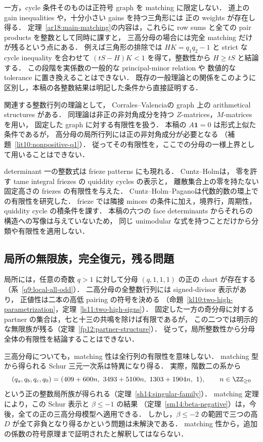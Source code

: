 一方，cycle 条件そのものは正符号 graph を matching に限定しない．
道上の gain inequalities や，十分小さい gains を持つ三角形には
正の weights が存在し得る．
定理~\ref{ar18:main-matching}の内容は，これらに
row sums と全ての pair products を整数として同時に課すと，
三高分母の場合には完全 matching だけが残るという点にある．
例えば三角形の排除では $HK=q_1q_2-1$ と strict な cycle inequality を合わせて
$(tS-H)K<1$ を得て，整数性から $H\ge tS$ と結論する．
この段階を実係数の一般的な principal-minor relation や
数値的な tolerance に置き換えることはできない．
既存の一般理論との関係をこのように区別し，本稿の各整数結果は明記した条件から直接証明する．

関連する整数行列の理論として，
Corrales--Valencia\cite[\S\S2--3]{CorralesValencia}の graph 上の arithmetical structures がある．
同理論は非正の非対角成分を持つ $Z$-matrices，$M$-matrices を用い，
固定した graph に対する有限性を扱う．
本稿の $A\mathbf1=0$ は形式上似た条件であるが，
高分母の局所行列には正の非対角成分が必要となる
（補題~\ref{lit10:nonpositive-q1}）．
従ってその有限性を，ここでの分母の一様上界として用いることはできない．

determinant 一の整数式は frieze patterns にも現れる．
Cuntz--Holm\cite[\S\S2--3 and~7]{CuntzHolmFriezes}は，
零を許す tame integral friezes の quiddity cycles の表示と，
離散集合上の零を持たない固定高さの friezes の有限性を与えた．
Cuntz--Holm--Pagano\cite{CuntzHolmPagano}は代数的数の環上での有限性を研究した．
frieze では隣接 minors の条件に加え，境界行，周期性，quiddity cycle の積条件を課す．
本稿の六つの face determinants からそれらの構造への写像は与えていないため，
同じ unimodular な式を持つことだけから分類や有限性を適用しない．

\subsection{局所の無限族，完全復元，残る問題}

局所には，任意の奇数 $q>1$ に対して分母 $(q,1,1,1)$ の正の chart が存在する
（系~\ref{q9:local-all-odd}）．
二高分母の全整数行列には signed-divisor 表示があり，
正値性は二本の高低 pairing の符号を決める
（命題~\ref{kl10:two-high-parametrization}，定理~\ref{ls11:two-high-signs}）．
固定した一方の奇分母に対する partner の集合は，七と十三の共鳴を除けば有限であるが，
この二つでは明示的な無限族が残る（定理~\ref{fp12:partner-structure}）．
従って，局所整数性から分母全体の有限性を結論することはできない．

三高分母についても，matching 性は全行列の有限性を意味しない．
matching 型から得られる Schur 三元一次系は特異になり得る．
実際，階数二の系から
\[
 (q_a,q_b,q_c,q_0)
 =(409+600n,\ 3493+5100n,\ 1303+1904n,\ 1),
 \qquad n\in\ZZ_{\ge0}
\]
という正の整数局所族が得られる（定理~\ref{sh14:singular-family}）．
matching 定理により，この Schur 表示と $\beta\le-1$ の結果
（定理~\ref{sm14:beta-negative}）は，今後，全ての正の三高分母模型へ適用できる．
しかし，$\beta\le-2$ の範囲で三つの高 $D$ が全て非負となり得るかという問題は未解決である．
matching 性から，追加の係数の符号原理まで証明されたと解釈してはならない．

